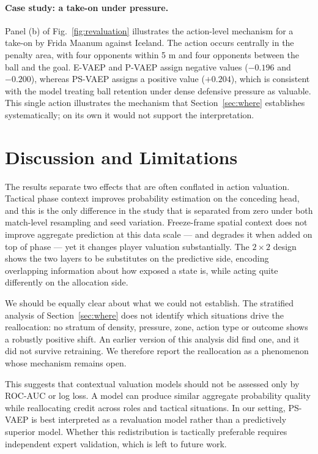 \documentclass[runningheads]{llncs}
\begin{document}
\paragraph{Case study: a take-on under pressure.}
Panel (b) of Fig.~\ref{fig:revaluation} illustrates the action-level mechanism for a take-on by Frida Maanum against Iceland. The action occurs centrally in the penalty area, with four opponents within 5 m and four opponents between the ball and the goal. E-VAEP and P-VAEP assign negative values ($-0.196$ and $-0.200$), whereas PS-VAEP assigns a positive value ($+0.204$), which is consistent with the model treating ball retention under dense defensive pressure as valuable. This single action illustrates the mechanism that Section~\ref{sec:where} establishes systematically; on its own it would not support the interpretation.


\section{Discussion and Limitations}

The results separate two effects that are often conflated in action valuation. Tactical phase context improves probability estimation on the conceding head, and this is the only difference in the study that is separated from zero under both match-level resampling and seed variation. Freeze-frame spatial context does not improve aggregate prediction at this data scale --- and degrades it when added on top of phase --- yet it changes player valuation substantially. The $2 \times 2$ design shows the two layers to be substitutes on the predictive side, encoding overlapping information about how exposed a state is, while acting quite differently on the allocation side.

We should be equally clear about what we could not establish. The stratified analysis of Section~\ref{sec:where} does not identify which situations drive the reallocation: no stratum of density, pressure, zone, action type or outcome shows a robustly positive shift. An earlier version of this analysis did find one, and it did not survive retraining. We therefore report the reallocation as a phenomenon whose mechanism remains open.

This suggests that contextual valuation models should not be assessed only by ROC-AUC or log loss. A model can produce similar aggregate probability quality while reallocating credit across roles and tactical situations. In our setting, PS-VAEP is best interpreted as a revaluation model rather than a predictively superior model. Whether this redistribution is tactically preferable requires independent expert validation, which is left to future work.
\end{document}
